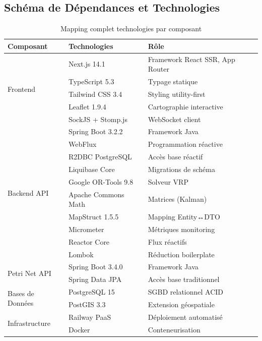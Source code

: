 \subsection{Schéma de Dépendances et Technologies}

\begin{table}[H]
\centering
\caption{Mapping complet technologies par composant}
\label{tab:tech_mapping}
\begin{tabular}{|l|l|p{6cm}|}
\hline
\textbf{Composant} & \textbf{Technologies} & \textbf{Rôle} \\
\hline
\multirow{5}{*}{Frontend} & Next.js 14.1 & Framework React SSR, App Router \\
& TypeScript 5.3 & Typage statique \\
& Tailwind CSS 3.4 & Styling utility-first \\
& Leaflet 1.9.4 & Cartographie interactive \\
& SockJS + Stomp.js & WebSocket client \\
\hline
\multirow{10}{*}{Backend API} & Spring Boot 3.2.2 & Framework Java \\
& WebFlux & Programmation réactive \\
& R2DBC PostgreSQL & Accès base réactif \\
& Liquibase Core & Migrations de schéma \\
& Google OR-Tools 9.8 & Solveur VRP \\
& Apache Commons Math & Matrices (Kalman) \\
& MapStruct 1.5.5 & Mapping Entity↔DTO \\
& Micrometer & Métriques monitoring \\
& Reactor Core & Flux réactifs \\
& Lombok & Réduction boilerplate \\
\hline
\multirow{2}{*}{Petri Net API} & Spring Boot 3.4.0 & Framework  Java \\
& Spring Data JPA & Accès base traditionnel \\
\hline
\multirow{2}{*}{Bases de Données} & PostgreSQL 15 & SGBD relationnel ACID \\
& PostGIS 3.3 & Extension géospatiale \\
\hline
\multirow{2}{*}{Infrastructure} & Railway PaaS & Déploiement automatisé \\
& Docker & Conteneurisation \\
\hline
\end{tabular}
\end{table}

